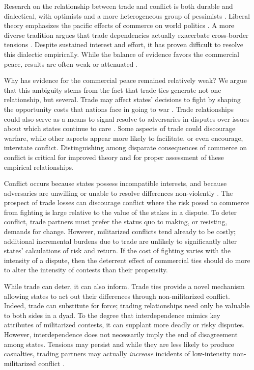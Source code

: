 \documentclass[12pt]{article}
\theoremstyle{hypothesis}
\begin{document}
\noindent\doublespace Research on the relationship between trade and conflict is both durable and dialectical, with optimists \citep{Montesquieu:1989,Cobden:1903,angell:1909,rosecrance:1985} and a more heterogeneous group of pessimists \citep{Thucydides:1985,Lenin:1975,carr:1939,waltz:1999}. Liberal theory emphasizes the pacific effects of commerce on world politics \citep{Oneal:1997,Polachek:1997,Pevehouse:2004}. A more diverse tradition argues that trade dependencies actually exacerbate cross-border tensions \citep{Krasner:1976,Waltz:1979,Grieco:1988,Gasiorowski:1986}. Despite sustained interest and effort, it has proven difficult to resolve this dialectic empirically. While the balance of evidence favors the commercial peace, results are often weak or attenuated \citep{Barbieri:1999,Mansfield:2001,Mansfield:2003a,Schneider:2014}.

Why has evidence for the commercial peace remained relatively weak?  We argue that this ambiguity stems from the fact that trade ties generate not one relationship, but several. Trade may affect states' decisions to fight by shaping the opportunity costs that nations face in going to war \citep{Russett:2001,Polachek:1980,Polachek:2010}. Trade relationships could also serve as a means to signal resolve to adversaries in disputes over issues about which states continue to care \citep{Gartzke:2001,Gartzke:2007,Morrow:1999b}. Some aspects of trade could discourage warfare, while other aspects appear more likely to facilitate, or even encourage, interstate conflict.  Distinguishing among disparate consequences of commerce on conflict is critical for improved theory and for proper assessment of these empirical relationships.

Conflict occurs because states possess incompatible interests, and because adversaries are unwilling or unable to resolve differences non-violently \citep{fearon:1995}. The prospect of trade losses can discourage conflict where the risk posed to commerce from fighting is large relative to the value of the stakes in a dispute.  To deter conflict, trade partners must prefer the status quo to making, or resisting, demands for change.   However, militarized conflicts tend already to be costly; additional incremental burdens due to trade are unlikely to significantly alter states' calculations of risk and return.  If the cost of fighting varies with the intensity of a dispute, then the deterrent effect of commercial ties should do more to alter the intensity of contests than their propensity.

While trade can deter, it can also inform.  Trade ties provide a novel mechanism allowing states to act out their differences through non-militarized conflict.  Indeed, trade can substitute for force; trading relationships need only be valuable to both sides in a dyad. To the degree that interdependence mimics key attributes of militarized contests, it can supplant more deadly or risky disputes.  However, interdependence does not necessarily imply the end of disagreement among states. Tensions may persist and while they are less likely to produce casualties, trading partners may actually {\it increase} incidents of low-intensity non-militarized conflict \citep{Gartzke:2003}.
\end{document}
